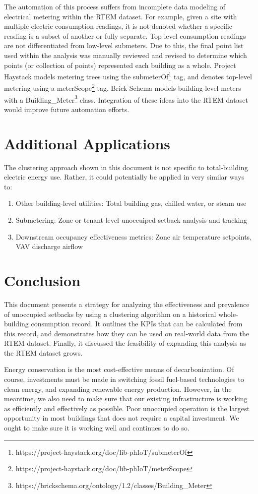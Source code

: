 \documentclass[a4paper]{article}
\begin{document}
The automation of this process suffers from incomplete data modeling of electrical metering within the RTEM dataset. For example, given a site with multiple electric consumption readings, it is not denoted whether a specific reading is a subset of another or fully separate. Top level consumption readings are not differentiated from low-level submeters. Due to this, the final point list used within the analysis was manually reviewed and revised to determine which points (or collection of points) represented each building as a whole. Project Haystack models metering trees using the submeterOf\footnote{https://project-haystack.org/doc/lib-phIoT/submeterOf} tag, and denotes top-level metering using a meterScope\footnote{https://project-haystack.org/doc/lib-phIoT/meterScope} tag. Brick Schema models building-level meters with a Building\_Meter\footnote{https://brickschema.org/ontology/1.2/classes/Building\_Meter} class. Integration of these ideas into the RTEM dataset would improve future automation efforts.

\section{Additional Applications}

The clustering approach shown in this document is not specific to total-building electric energy use. Rather, it could potentially be applied in very similar ways to:
\begin{enumerate}
\item{Other building-level utilities: Total building gas, chilled water, or steam use}
\item{Submetering: Zone or tenant-level unoccuiped setback analysis and tracking}
\item{Downstream occupancy effectiveness metrics: Zone air temperature setpoints, VAV discharge airflow}
\end{enumerate}

\section{Conclusion}

This document presents a strategy for analyzing the effectiveness and prevalence of unoccupied setbacks by using a clustering algorithm on a historical whole-building consumption record. It outlines the KPIs that can be calculated from this record, and demonstrates how they can be used on real-world data from the RTEM dataset. Finally, it discussed the feasibility of expanding this analysis as the RTEM dataset grows.

Energy conservation is the most cost-effective means of decarbonization. Of course, investments must be made in switching fossil fuel-based technologies to clean energy, and expanding renewable energy production. However, in the meantime, we also need to make sure that our existing infrastructure is working as efficiently and effectively as possible. Poor unoccupied operation is the largest opportunity in most buildings that does not require a capital investment. We ought to make sure it is working well and continues to do so.
\end{document}
